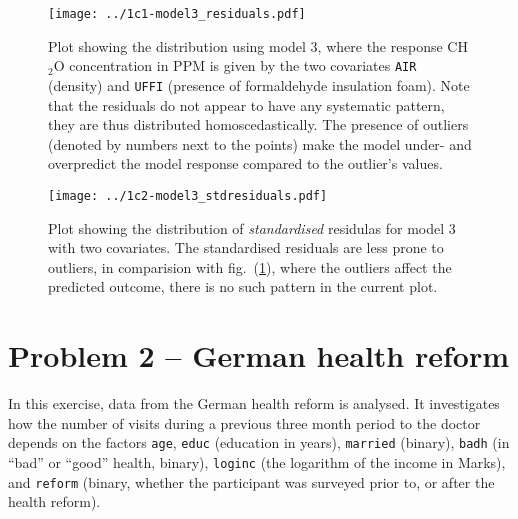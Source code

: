 \documentclass[a4paper,11pt]{article}
\begin{document}
\begin{enumerate}[label=1\alph*)]
        \begin{figure}[htb]
            \centering
            \texttt{[image: ../1c1-model3\_residuals.pdf]}
            \caption{Plot showing the distribution using model 3, where the response CH$_2$O concentration in PPM is given by the two covariates \texttt{AIR} (density) and \texttt{UFFI} (presence of formaldehyde insulation foam). Note that the residuals do not appear to have any systematic pattern, they are thus distributed homoscedastically. The presence of outliers (denoted by numbers next to the points) make the model under- and overpredict the model response compared to the outlier's values. }
            \label{fig:1c-1}
        \end{figure}
        \begin{figure}[htb]
            \centering
            \texttt{[image: ../1c2-model3\_stdresiduals.pdf]}
            \caption{Plot showing the distribution of \textit{standardised} residulas for model 3 with two covariates. The standardised residuals are less prone to outliers, in comparision with fig.~(\ref{fig:1c-1}), where the outliers affect the predicted outcome, there is no such pattern in the current plot. }
            \label{fig:1c-2}
        \end{figure}
\end{enumerate}

\clearpage
\section*{Problem 2 -- German health reform}
    In this exercise, data from the German health reform is analysed. It investigates how the number of visits during a previous three month period to the doctor depends on the factors \texttt{age}, \texttt{educ} (education in years), \texttt{married} (binary), \texttt{badh} (in ``bad'' or ``good'' health, binary), \texttt{loginc} (the logarithm of the income in Marks), and \texttt{reform} (binary, whether the participant was surveyed prior to, or after the health reform).  
\end{document}
